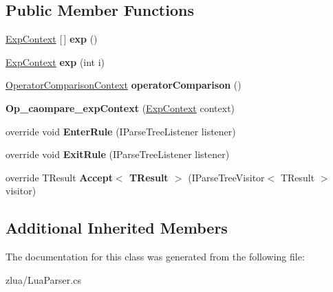 \subsection*{Public Member Functions}
\begin{DoxyCompactItemize}
\item 
\mbox{\label{classzlua_1_1_lua_parser_1_1_op__caompare__exp_context_a0850761d0d671653cfcdd730a0f553b1}} 
\mbox{\hyperlink{classzlua_1_1_lua_parser_1_1_exp_context}{Exp\+Context}} \mbox{[}$\,$\mbox{]} {\bfseries exp} ()
\item 
\mbox{\label{classzlua_1_1_lua_parser_1_1_op__caompare__exp_context_aa9caf4a253364153e0b79d9dc430462b}} 
\mbox{\hyperlink{classzlua_1_1_lua_parser_1_1_exp_context}{Exp\+Context}} {\bfseries exp} (int i)
\item 
\mbox{\label{classzlua_1_1_lua_parser_1_1_op__caompare__exp_context_adf92d08174ddb87253dbd1fbbb915e00}} 
\mbox{\hyperlink{classzlua_1_1_lua_parser_1_1_operator_comparison_context}{Operator\+Comparison\+Context}} {\bfseries operator\+Comparison} ()
\item 
\mbox{\label{classzlua_1_1_lua_parser_1_1_op__caompare__exp_context_a11aef100257fcdc59243dd5b9a283bde}} 
{\bfseries Op\+\_\+caompare\+\_\+exp\+Context} (\mbox{\hyperlink{classzlua_1_1_lua_parser_1_1_exp_context}{Exp\+Context}} context)
\item 
\mbox{\label{classzlua_1_1_lua_parser_1_1_op__caompare__exp_context_aa89486b06aec5857d6251f7022354d36}} 
override void {\bfseries Enter\+Rule} (I\+Parse\+Tree\+Listener listener)
\item 
\mbox{\label{classzlua_1_1_lua_parser_1_1_op__caompare__exp_context_aad8b5d26153c55d04781698607c7436e}} 
override void {\bfseries Exit\+Rule} (I\+Parse\+Tree\+Listener listener)
\item 
\mbox{\label{classzlua_1_1_lua_parser_1_1_op__caompare__exp_context_a8109092dd5941727ac36957f453a467a}} 
override T\+Result {\bfseries Accept$<$ T\+Result $>$} (I\+Parse\+Tree\+Visitor$<$ T\+Result $>$ visitor)
\end{DoxyCompactItemize}
\subsection*{Additional Inherited Members}


The documentation for this class was generated from the following file\+:\begin{DoxyCompactItemize}
\item 
zlua/Lua\+Parser.\+cs\end{DoxyCompactItemize}
